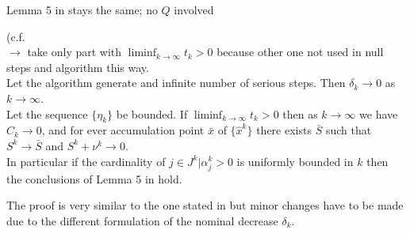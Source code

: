 \vspace{1.5em}

Lemma 5 in \cite{Hare2016} stays the same; no \(Q\) involved \\

\begin{theorem}(c.f.\cite[Theorem 6]{Hare2016}\\
	\(\to\) take only part with \(\liminf_{k\to\infty}t_k > 0 \) because other one not used in null steps and algorithm this way. \\
	Let the algorithm generate and infinite number of serious steps. Then \(\delta_k \to 0\) as \(k \to \infty\). \\
	Let the sequence \(\{\eta_k\}\) be bounded. If \(\liminf_{k \to \infty} t_k > 0\) then as \(k \to \infty\) we have \(C_k \to 0\), and for ever accumulation point \(\bar{x}\) of \(\{\hat{x}^k\}\) there exists \(\bar{S}\) such that \(S^k \to \bar{S}\) and \(S^k + \nu^k \to 0\). \\
	In particular if the cardinality of \({j \in J^k|\alpha_j^k > 0}\) is uniformly bounded in \(k\) then the conclusions of Lemma 5 in \cite{Hare2016} hold.
\end{theorem}

The proof is very similar to the one stated in \cite{Hare2016} but minor changes have to be made due to the different formulation of the nominal decrease \(\delta_k\).

